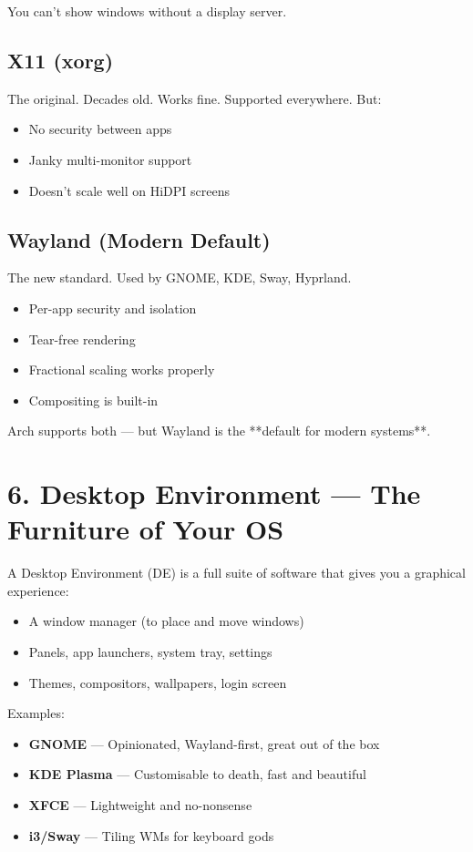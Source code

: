 \documentclass[12pt,openany]{book}
\begin{document}
You can’t show windows without a display server.

\subsection*{X11 (xorg)}

The original. Decades old. Works fine. Supported everywhere. But:

\begin{itemize}
  \item No security between apps
  \item Janky multi-monitor support
  \item Doesn't scale well on HiDPI screens
\end{itemize}

\subsection*{Wayland (Modern Default)}

The new standard. Used by GNOME, KDE, Sway, Hyprland.

\begin{itemize}
  \item Per-app security and isolation
  \item Tear-free rendering
  \item Fractional scaling works properly
  \item Compositing is built-in
\end{itemize}

Arch supports both — but Wayland is the **default for modern systems**.

\section{6. Desktop Environment — The Furniture of Your OS}

A Desktop Environment (DE) is a full suite of software that gives you a graphical experience:

\begin{itemize}
  \item A window manager (to place and move windows)
  \item Panels, app launchers, system tray, settings
  \item Themes, compositors, wallpapers, login screen
\end{itemize}

Examples:

\begin{itemize}
  \item \textbf{GNOME} — Opinionated, Wayland-first, great out of the box
  \item \textbf{KDE Plasma} — Customisable to death, fast and beautiful
  \item \textbf{XFCE} — Lightweight and no-nonsense
  \item \textbf{i3/Sway} — Tiling WMs for keyboard gods
\end{itemize}
\end{document}
